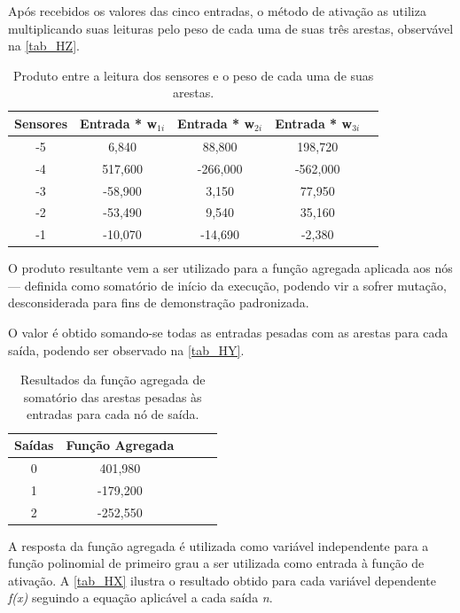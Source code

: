 Após recebidos os valores das cinco entradas, o método de ativação as utiliza multiplicando suas leituras
pelo peso de cada uma de suas três arestas, observável na \autoref{tab_HZ}.

\begin{table}[htb]
	\centering
    \caption{\label{tab_HZ}Produto entre a leitura dos sensores e o peso de cada uma de suas arestas.}
    \begin{tabular}{ccccc}
        \hline
		\textbf{Sensores} & \textbf{Entrada * w$_{1i}$} & \textbf{Entrada * w$_{2i}$} & \textbf{Entrada * w$_{3i}$} \\ \hline
		-5 & 6,840  & 88,800   & 198,720    \\ \hline
		-4 & 517,600  & -266,000   & -562,000    \\ \hline
		-3 & -58,900  & 3,150   & 77,950   \\ \hline
		-2 & -53,490  & 9,540   & 35,160  \\ \hline
		-1 & -10,070  & -14,690   & -2,380   \\ \hline
    \end{tabular}
    
\end{table}

O produto resultante vem a ser utilizado para a função agregada aplicada aos nós — definida como somatório de início da execução,
podendo vir a sofrer mutação, desconsiderada para fins de demonstração padronizada. 

O valor é obtido somando-se todas as entradas pesadas com as arestas para cada saída, podendo ser observado na \autoref{tab_HY}.

\begin{table}[htb]
	\centering
    \caption{\label{tab_HY}Resultados da função agregada de somatório das arestas pesadas às entradas para cada nó de saída.}
    \begin{tabular}{ccccc}
        \hline
		\textbf{Sa\'{i}das} & \textbf{Fun\c{c}\~{a}o Agregada} \\ \hline
		0 & 401,980    \\ \hline
		1 & -179,200    \\ \hline
		2 & -252,550  \\ \hline
    \end{tabular}
    
\end{table}

A resposta da função agregada é utilizada como variável independente para a função polinomial de primeiro grau a ser utilizada
como entrada à função de ativação. A \autoref{tab_HX} ilustra o resultado obtido para cada variável dependente \textit{f(x)}
seguindo a equação aplicável a cada saída \textit{n}.

